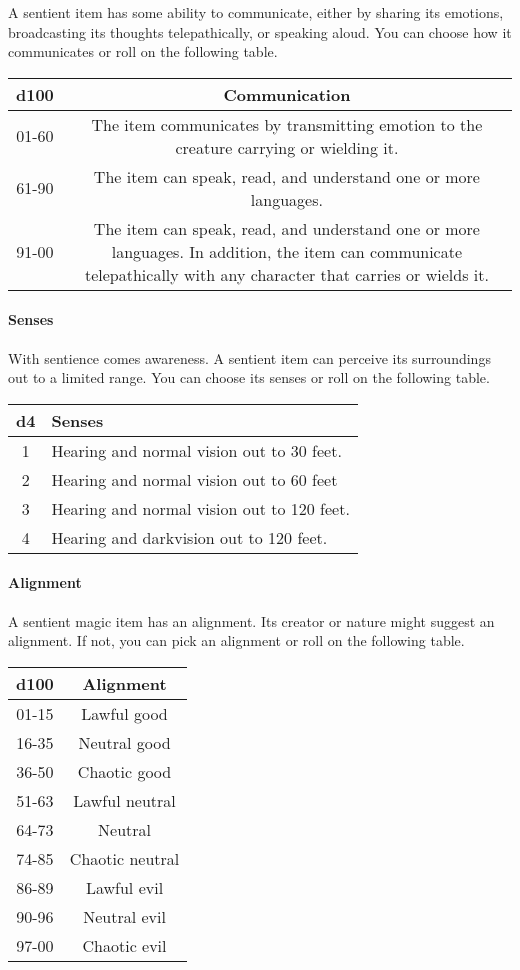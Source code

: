 \documentclass[
]{article}
\begin{document}
A sentient item has some ability to communicate, either by sharing its
emotions, broadcasting its thoughts telepathically, or speaking aloud.
You can choose how it communicates or roll on the following table.

\begin{longtable}[]{@{}cc@{}}
\toprule
d100 & Communication\tabularnewline
\midrule
\endhead
01-60 & The item communicates by transmitting emotion to the creature
carrying or wielding it.\tabularnewline
61-90 & The item can speak, read, and understand one or more
languages.\tabularnewline
91-00 & The item can speak, read, and understand one or more languages.
In addition, the item can communicate telepathically with any character
that carries or wields it.\tabularnewline
\bottomrule
\end{longtable}

\hypertarget{senses}{%
\paragraph{Senses}\label{senses}}

With sentience comes awareness. A sentient item can perceive its
surroundings out to a limited range. You can choose its senses or roll
on the following table.

\begin{longtable}[]{@{}cl@{}}
\toprule
d4 & Senses\tabularnewline
\midrule
\endhead
1 & Hearing and normal vision out to 30 feet.\tabularnewline
2 & Hearing and normal vision out to 60 feet\tabularnewline
3 & Hearing and normal vision out to 120 feet.\tabularnewline
4 & Hearing and darkvision out to 120 feet.\tabularnewline
\bottomrule
\end{longtable}

\hypertarget{alignment}{%
\paragraph{Alignment}\label{alignment}}

A sentient magic item has an alignment. Its creator or nature might
suggest an alignment. If not, you can pick an alignment or roll on the
following table.

\begin{longtable}[]{@{}cc@{}}
\toprule
d100 & Alignment\tabularnewline
\midrule
\endhead
01-15 & Lawful good\tabularnewline
16-35 & Neutral good\tabularnewline
36-50 & Chaotic good\tabularnewline
51-63 & Lawful neutral\tabularnewline
64-73 & Neutral\tabularnewline
74-85 & Chaotic neutral\tabularnewline
86-89 & Lawful evil\tabularnewline
90-96 & Neutral evil\tabularnewline
97-00 & Chaotic evil\tabularnewline
\bottomrule
\end{longtable}
\end{document}
